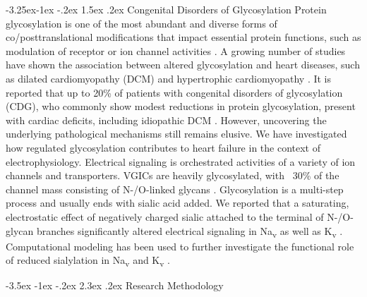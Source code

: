 \documentclass[11pt]{article}
\makeatletter
\renewcommand\section{\@startsection {section}{1}{\z@}%
                                   {-3.5ex \@plus -1ex \@minus -.2ex}%
                                   {2.3ex \@plus.2ex}%
                                   {\normalfont\fontfamily{phv}\fontsize{16}{19}\bfseries}}
\renewcommand\subsection{\@startsection{subsection}{2}{\z@}%
                                     {-3.25ex\@plus -1ex \@minus -.2ex}%
                                     {1.5ex \@plus .2ex}%
                                     {\normalfont\fontfamily{phv}\fontsize{14}{17}\bfseries}}
\makeatother
\begin{document}
\subsection{Congenital Disorders of Glycosylation}
Protein glycosylation is one of the most abundant and diverse forms of co/posttranslational modifications that impact essential protein functions, such as modulation of receptor or ion channel activities \citep{ohtsubo2006glycosylation,ednie2012modulation}. A growing number of studies have shown the association between altered glycosylation and heart diseases, such as dilated cardiomyopathy (DCM) and hypertrophic cardiomyopathy \citep{ednie2019reduced2,ohtsubo2006glycosylation}. It is reported that up to 20\% of patients with congenital disorders of glycosylation (CDG), who commonly show modest reductions in protein glycosylation, present with cardiac deficits, including idiopathic DCM \citep{marques2017cardiac}. However, uncovering the underlying pathological mechanisms still remains elusive. We have investigated how regulated glycosylation contributes to heart failure in the context of electrophysiology. Electrical signaling is orchestrated activities of a variety of ion channels and transporters. VGICs are heavily glycosylated, with ~30\% of the channel mass consisting of N-/O-linked glycans \citep{ednie2012modulation}. Glycosylation is a multi-step process and usually ends with sialic acid added. We reported that a saturating, electrostatic effect of negatively charged sialic attached to the terminal of N-/O-glycan branches significantly altered electrical signaling in Na\textsubscript{v} \citep{ednie2013sialicNav1,ednie2015sialicNav2} as well as K\textsubscript{v} \citep{ednie2015sialicKv}. Computational modeling has been used to further investigate the functional role of reduced sialylation in Na\textsubscript{v} and K\textsubscript{v} \citep{du2015statistical,du2017silico}.

\section{Research Methodology}
\end{document}

